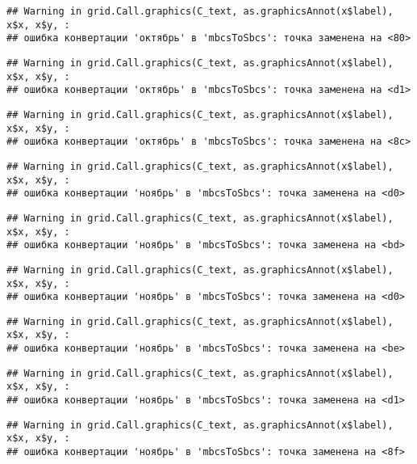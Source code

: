 \documentclass[
]{article}
\begin{document}
\begin{verbatim}
## Warning in grid.Call.graphics(C_text, as.graphicsAnnot(x$label), x$x, x$y, :
## ошибка конвертации 'октябрь' в 'mbcsToSbcs': точка заменена на <80>
\end{verbatim}

\begin{verbatim}
## Warning in grid.Call.graphics(C_text, as.graphicsAnnot(x$label), x$x, x$y, :
## ошибка конвертации 'октябрь' в 'mbcsToSbcs': точка заменена на <d1>
\end{verbatim}

\begin{verbatim}
## Warning in grid.Call.graphics(C_text, as.graphicsAnnot(x$label), x$x, x$y, :
## ошибка конвертации 'октябрь' в 'mbcsToSbcs': точка заменена на <8c>
\end{verbatim}

\begin{verbatim}
## Warning in grid.Call.graphics(C_text, as.graphicsAnnot(x$label), x$x, x$y, :
## ошибка конвертации 'ноябрь' в 'mbcsToSbcs': точка заменена на <d0>
\end{verbatim}

\begin{verbatim}
## Warning in grid.Call.graphics(C_text, as.graphicsAnnot(x$label), x$x, x$y, :
## ошибка конвертации 'ноябрь' в 'mbcsToSbcs': точка заменена на <bd>
\end{verbatim}

\begin{verbatim}
## Warning in grid.Call.graphics(C_text, as.graphicsAnnot(x$label), x$x, x$y, :
## ошибка конвертации 'ноябрь' в 'mbcsToSbcs': точка заменена на <d0>
\end{verbatim}

\begin{verbatim}
## Warning in grid.Call.graphics(C_text, as.graphicsAnnot(x$label), x$x, x$y, :
## ошибка конвертации 'ноябрь' в 'mbcsToSbcs': точка заменена на <be>
\end{verbatim}

\begin{verbatim}
## Warning in grid.Call.graphics(C_text, as.graphicsAnnot(x$label), x$x, x$y, :
## ошибка конвертации 'ноябрь' в 'mbcsToSbcs': точка заменена на <d1>
\end{verbatim}

\begin{verbatim}
## Warning in grid.Call.graphics(C_text, as.graphicsAnnot(x$label), x$x, x$y, :
## ошибка конвертации 'ноябрь' в 'mbcsToSbcs': точка заменена на <8f>
\end{verbatim}
\end{document}
